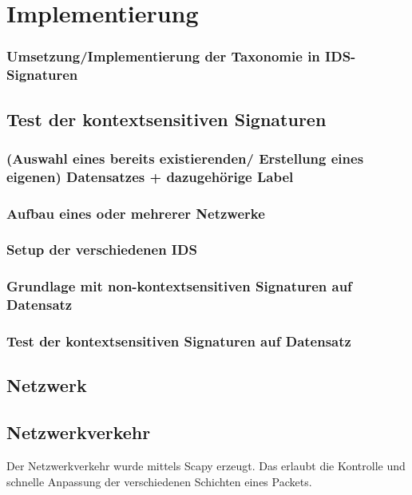 \chapter{Implementierung}%
\label{cha:implementation}



		\subsection{ Umsetzung/Implementierung der Taxonomie in  IDS-Signaturen}
\section{Test der kontextsensitiven Signaturen}

\subsection{ (Auswahl eines bereits existierenden/ Erstellung eines eigenen) Datensatzes + dazugehörige Label }
\subsection{ Aufbau eines oder mehrerer Netzwerke  } 
\subsection{ Setup der verschiedenen IDS }
\subsection{ Grundlage mit non-kontextsensitiven Signaturen auf Datensatz }
\subsection{ Test der kontextsensitiven Signaturen auf Datensatz} 

\section{Netzwerk}


\section{Netzwerkverkehr}
Der Netzwerkverkehr wurde mittels Scapy erzeugt. Das erlaubt die Kontrolle und schnelle Anpassung der verschiedenen Schichten eines Packets.
